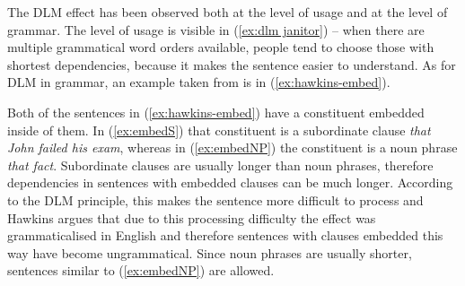 The DLM effect has been observed both at the level of usage and at the level of grammar. The level of usage is visible in (\ref{ex:dlm janitor}) -- when there are multiple grammatical word orders available, people tend to choose those with shortest dependencies, because it makes the sentence easier to understand. As for DLM in grammar, an example taken from \cite[p.~20]{Hawkins-1994} is in (\ref{ex:hawkins-embed}). 
\begin{exe}
\ex\label{ex:hawkins-embed}
\begin{xlist}
	\label{ex:embedS}
	\label{ex:embedNP}
\end{xlist}
\end{exe}
Both of the sentences in (\ref{ex:hawkins-embed}) have a constituent embedded inside of them. In (\ref{ex:embedS}) that constituent is a subordinate clause \textsl{that John failed his exam}, whereas in (\ref{ex:embedNP}) the constituent is a noun phrase \textsl{that fact}. Subordinate clauses are usually longer than noun phrases, therefore dependencies in sentences with embedded clauses can be much longer. According to the DLM principle, this makes the sentence more difficult to process and Hawkins argues that due to this processing difficulty the effect was grammaticalised in English and therefore sentences with clauses embedded this way have become ungrammatical. Since noun phrases are usually shorter, sentences similar to (\ref{ex:embedNP}) are allowed. 





